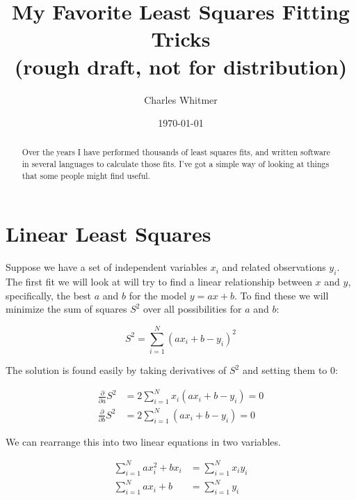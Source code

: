 \documentclass[letterpaper,12pt]{article}
\begin{document}
\title{My Favorite Least Squares Fitting Tricks \\ (rough draft, not for distribution)}
\author{Charles Whitmer}
\date{\today}
\maketitle

\begin{abstract}
Over the years I have performed thousands of least squares fits, and written software in several languages to calculate those fits. I've got a simple way of looking at things that some people might find useful.
\end{abstract}

\section{Linear Least Squares}
\label{sec.one}
Suppose we have a set of independent variables $x_i$ and related observations $y_i$. The first fit we will look at will try to find a linear relationship between $x$ and $y$, specifically, the best $a$ and $b$ for the model $y=ax+b$. To find these we will minimize the sum of squares $S^2$ over all possibilities for $a$ and $b$:

\begin{equation} \label{S.square}
S^2=\sum_{i=1}^N (a x_i + b - y_i)^2
\end{equation}

The solution is found easily by taking derivatives of $S^2$ and setting them to $0$:

\begin{equation}
\begin{aligned}
\frac{\partial}{\partial a}S^2&=2\sum_{i=1}^N x_i(a x_i+b-y_i)=0\\
\frac{\partial}{\partial b}S^2&=2\sum_{i=1}^N (a x_i+b-y_i)=0
\end{aligned}
\end{equation}

We can rearrange this into two linear equations in two variables.

\begin{equation}
\begin{aligned}
\label{linear1}
\sum_{i=1}^N a x_i^2+b x_i &= \sum_{i=1}^N x_i y_i\\
\sum_{i=1}^N a x_i+b &= \sum_{i=1}^N y_i
\end{aligned}
\end{equation}
\end{document}
